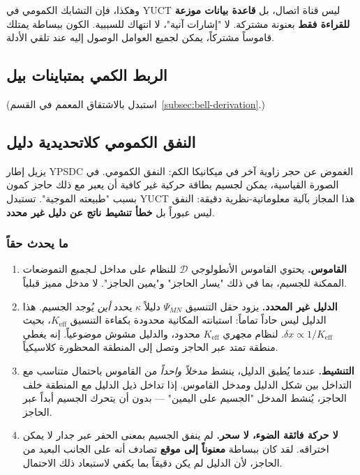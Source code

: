 \documentclass[12pt,a4paper]{article}
\theoremstyle{remark}
\begin{document}
	وهكذا، فإن التشابك الكمومي في YUCT ليس قناة اتصال، بل \textbf{قاعدة بيانات موزعة للقراءة فقط} بعنونة مشتركة. لا "إشارات آنية"، لا انتهاك للسببية. الكون ببساطة يمتلك قاموساً مشتركاً، يمكن لجميع العوامل الوصول إليه عند تلقي الأدلة.
	
	\subsection{الربط الكمي بمتباينات بيل}
	\label{subsec:bell-inequalities}
	
	(استبدل بالاشتقاق المعمم في القسم~\ref{subsec:bell-derivation}.)
	
	\subsection{النفق الكمومي كلاتحديدية دليل}
	
	يزيل إطار YPSDC الغموض عن حجر زاوية آخر في ميكانيكا الكم: النفق الكمومي. في الصورة القياسية، يمكن لجسيم بطاقة حركية غير كافية أن يعبر مع ذلك حاجز كمون بسبب "طبيعته الموجية". تستبدل YUCT هذا المجاز بآلية معلوماتية-نظرية دقيقة: النفق ليس عبوراً بل \textbf{خطأ تنشيط ناتج عن دليل غير محدد}.
	
	\subsubsection{ما يحدث حقاً}
	
	\begin{enumerate}[leftmargin=*]
		\item \textbf{القاموس.}
		يحتوي القاموس الأنطولوجي \(\mathcal{D}\) للنظام على مداخل لـ\emph{جميع} التموضعات الممكنة للجسيم، بما في ذلك "يسار الحاجز" و"يمين الحاجز". لا مدخل مميز قبلياً.
		
		\item \textbf{الدليل غير المحدد.}
		يزود حقل التنسيق \(\Psi_{MN}\) دليلاً \(\kappa\) يحدد \emph{أين} يُوجد الجسيم. هذا الدليل ليس حاداً تماماً: استبانته المكانية محدودة بكفاءة التنسيق \(K_{\mathrm{eff}}\)، بحيث \(\delta x \propto 1/K_{\mathrm{eff}}\). لنظام مجهري \(K_{\mathrm{eff}}\) محدود، والدليل مشوش موضوعياً. إنه يغطي منطقة تمتد عبر الحاجز وتصل إلى المنطقة المحظورة كلاسيكياً.
		
		\item \textbf{التنشيط.}
		عندما يُطبق الدليل، ينشط \emph{مدخلاً واحداً} من القاموس باحتمال متناسب مع التداخل بين شكل الدليل ومدخل القاموس. إذا تداخل ذيل الدليل مع المنطقة خلف الحاجز، يُنشط المدخل "الجسيم على اليمين" — بدون أن يتحرك الجسيم أبداً عبر الحاجز.
		
		\item \textbf{لا حركة فائقة الضوء، لا سحر.}
		لم ينفق الجسيم بمعنى الحفر عبر جدار لا يمكن اختراقه. لقد كان ببساطة \textbf{معنوناً إلى موقع} تصادف أنه على الجانب البعيد من الحاجز، لأن الدليل لم يكن دقيقاً بما يكفي لاستبعاد ذلك الاحتمال.
	\end{enumerate}
	
\end{document}
